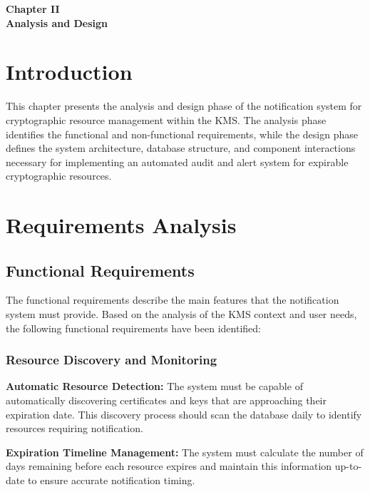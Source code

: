 
\vspace*{9cm}
\begin{doublespace}
    \centering
    \textbf{ \huge Chapter II \\ [1 cm] Analysis and Design}
\end{doublespace}

\newpage
\fancyhead[R]{\rightmark}

\setcounter{section}{0}
\section*{Introduction}

This chapter presents the analysis and design phase of the notification system for cryptographic resource management within the KMS. The analysis phase identifies the functional and non-functional requirements, while the design phase defines the system architecture, database structure, and component interactions necessary for implementing an automated audit and alert system for expirable cryptographic resources.

\section{Requirements Analysis}

\subsection{Functional Requirements}

The functional requirements describe the main features that the notification system must provide. Based on the analysis of the KMS context and user needs, the following functional requirements have been identified:

\subsubsection{Resource Discovery and Monitoring}

\textbf{Automatic Resource Detection:} The system must be capable of automatically discovering certificates and keys that are approaching their expiration date. This discovery process should scan the database daily to identify resources requiring notification.

\noindent
\textbf{Expiration Timeline Management:} The system must calculate the number of days remaining before each resource expires and maintain this information up-to-date to ensure accurate notification timing.

